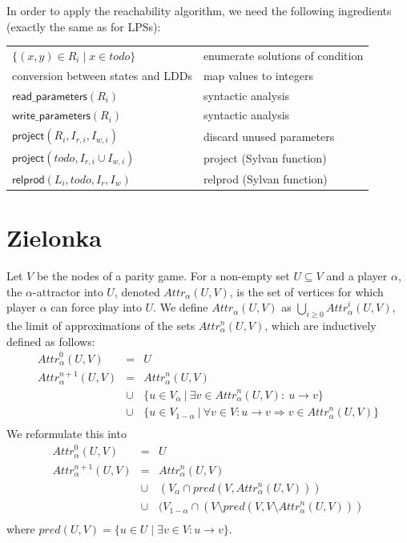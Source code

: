 \documentclass{article}
\newcommand{\var}[1]{\ensuremath{\textit{#1}}}
\newcommand{\attrsym}{\ensuremath{\textit{Attr}}}
\newcommand{\attr}[3][]{\ensuremath{\attrsym^{#1}_{#2}(#3)}}
\newcommand{\pred}{\ensuremath{\textit{pred}}}
\begin{document}
In order to apply the reachability algorithm, we need the following ingredients (exactly the same as for LPSs):

\begin{center}
\label{table:ingredients}
\begin{tabular}{ |l|l| }
\hline
$\{ (x,y) \in R_i \mid x \in todo \}$ & enumerate solutions of condition \\
conversion between states and LDDs & map values to integers \\
$\textsf{read\_parameters}(R_i)$ & syntactic analysis \\
$\textsf{write\_parameters}(R_i)$ & syntactic analysis \\
$\textsf{project}(R_i, I_{r,i}, I_{w,i})$ & discard unused parameters \\
$\textsf{project}(\var{todo}, I_{r,i} \cup I_{w,i})$ & \textsf{project} (Sylvan function) \\
$\textsf{relprod}(L_i, \var{todo}, I_r, I_w)$ & \textsf{relprod} (Sylvan function) \\
\hline
\end{tabular}
\end{center}

\newpage
\section{Zielonka}
Let $V$ be the nodes of a parity game.
For a non-empty set $U \subseteq V$ and a player $\alpha$, the
$\alpha$-attractor into $U$, denoted $\attr{\alpha}{U,V}$,
is the set of vertices for which player
$\alpha$ can force play into $U$. We define $\attr{\alpha}{U,V}$ as
$\bigcup\limits_{i \ge 0} \attr[i]{\alpha}{U,V}$,
the limit of approximations\label{def:attractor} of the
sets $\attr[n]{\alpha}{U,V}$, which are inductively defined as follows:
\[
\begin{array}{lcl}
\attr[0]{\alpha}{U, V} & = & U \\
\attr[n+1]{\alpha}{U, V} & = & \attr[n]{\alpha}{U, V} \\
      & \cup & \{u \in V_{\alpha} ~|~ \exists v \in \attr[n]{\alpha}{U,V}:~ u \to v \} \\
      & \cup & \{u \in V_{1 - \alpha} ~|~ \forall v \in V: u \to v \Rightarrow v \in \attr[n]{\alpha}{U, V}\} \\
\end{array}
\]
We reformulate this into
\[
\begin{array}{lcl}
\attr[0]{\alpha}{U, V} & = & U \\
\attr[n+1]{\alpha}{U, V} & = & \attr[n]{\alpha}{U, V} \\
      & \cup & (V_{\alpha} \cap \pred(V, \attr[n]{\alpha}{U, V})) \\
      & \cup & (V_{1 - \alpha} \cap (V \setminus \pred(V, V \setminus \attr[n]{\alpha}{U,V})) \\
\end{array}
\]
where $\pred(U, V) = \{ u \in U \mid \exists v \in V: u \rightarrow v \}$.
\end{document}

